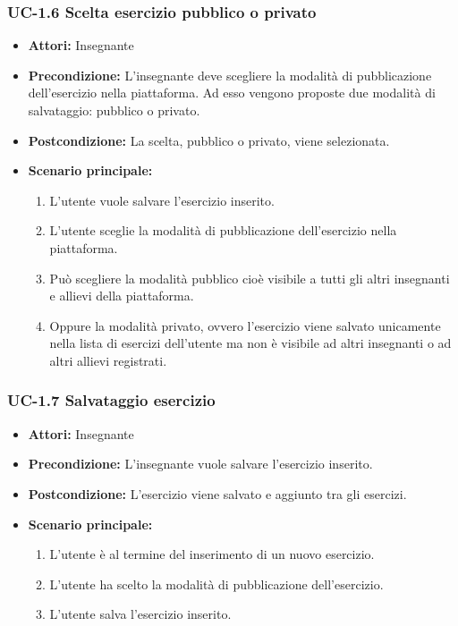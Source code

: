 \subsubsection{UC-1.6 Scelta esercizio pubblico o privato}
\begin{itemize}
\item \textbf{Attori: }Insegnante

\item \textbf{Precondizione: }L'insegnante deve scegliere la modalità di pubblicazione dell'esercizio nella piattaforma. Ad esso vengono proposte due modalità di salvataggio: pubblico o privato.
\item \textbf{Postcondizione: }La scelta, pubblico o privato, viene selezionata.
\item \textbf{Scenario principale: }
		\begin{enumerate}
		\item L'utente vuole salvare l'esercizio inserito.
		\item L'utente sceglie la modalità di pubblicazione dell'esercizio nella piattaforma. 
		\item Può scegliere la modalità pubblico cioè visibile a tutti gli altri insegnanti e allievi della piattaforma.
		\item Oppure la modalità privato, ovvero l'esercizio viene salvato unicamente nella lista di esercizi dell'utente ma non è visibile ad altri insegnanti o ad altri allievi registrati.
		\end{enumerate}
\end{itemize}
\subsubsection{UC-1.7 Salvataggio esercizio}
\begin{itemize}
\item \textbf{Attori: }Insegnante

\item \textbf{Precondizione: }L'insegnante vuole salvare l'esercizio inserito.
\item \textbf{Postcondizione: }L'esercizio viene salvato e aggiunto tra gli esercizi.
\item \textbf{Scenario principale: }
		\begin{enumerate}
		\item L'utente è al termine del inserimento di un nuovo esercizio.
		\item L'utente ha scelto la modalità di pubblicazione dell'esercizio.
		\item L'utente salva l'esercizio inserito.
		\end{enumerate}
\end{itemize}
